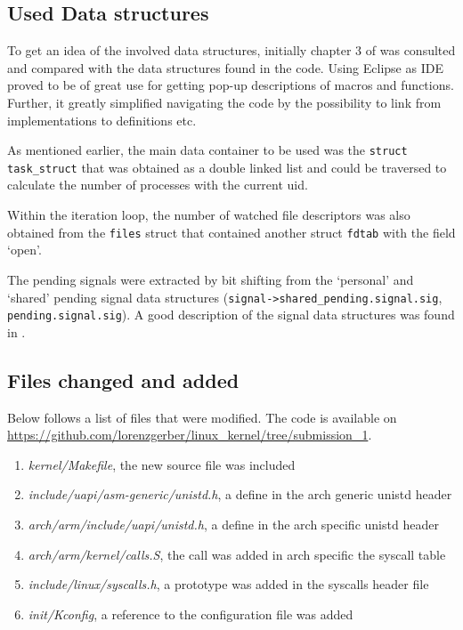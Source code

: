 \documentclass[a4paper,11pt,twoside]{article}
\begin{document}
\subsection{Used Data structures}
To get an idea of the involved data structures, initially chapter 3 of
\cite{bovetcesati2005} was consulted and compared with the data structures found
in the code. Using Eclipse as IDE proved to be of great use for getting pop-up
descriptions of macros and functions. Further, it greatly simplified navigating
the code by the possibility to link from implementations to definitions etc.

As mentioned earlier, the main data container to be used was the
\verb+struct task_struct+ that was obtained as a double linked list and could be
traversed to calculate the number of processes with the current uid.

Within the iteration loop, the number of watched file descriptors was also
obtained from the \verb+files+ struct that contained another struct \verb+fdtab+
with the field `open'.

The pending signals were extracted by bit shifting from the `personal' and `shared'
pending signal data structures (\verb+signal->shared_pending.signal.sig+,
\verb+pending.signal.sig+). A good description of the signal data structures was
found in \cite{love2010}.

\subsection{Files changed and added}
Below follows a list of files that were modified. The code is available on
\url{https://github.com/lorenzgerber/linux_kernel/tree/submission_1}.
\begin{enumerate}
  \item \textit{kernel/Makefile}, the new source file was included
  \item \textit{include/uapi/asm-generic/unistd.h}, a define in the arch generic
  unistd header
  \item \textit{arch/arm/include/uapi/unistd.h}, a define in the arch specific
  unistd header
  \item \textit{arch/arm/kernel/calls.S}, the call was added in arch specific
  the syscall table
  \item \textit{include/linux/syscalls.h}, a prototype was added in the syscalls
  header file
  \item \textit{init/Kconfig}, a reference to the configuration file was added
\end{enumerate}
\end{document}
